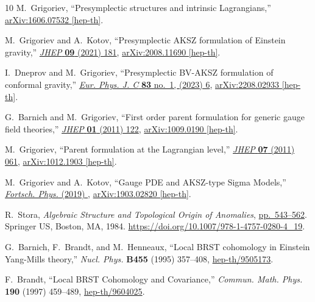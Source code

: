 \documentclass[a4paper,12pt]{article}
\numberwithin{equation}{section} %
\begin{document}
\begin{thebibliography}{10}
M.~Grigoriev, ``{Presymplectic structures and intrinsic Lagrangians},''
\href{http://arxiv.org/abs/1606.07532}{{\ttfamily arXiv:1606.07532 [hep-th]}}.

M.~Grigoriev and A.~Kotov, ``{Presymplectic AKSZ formulation of Einstein gravity},'' \href{http://dx.doi.org/10.1007/JHEP09(2021)181}{{\em JHEP} {\bfseries 09} (2021) 181}, \href{http://arxiv.org/abs/2008.11690}{{\ttfamily arXiv:2008.11690 [hep-th]}}.

I.~Dneprov and M.~Grigoriev, ``{Presymplectic BV-AKSZ formulation of conformal gravity},'' \href{http://dx.doi.org/10.1140/epjc/s10052-022-11082-6}{{\em Eur. Phys. J. C} {\bfseries 83} no.~1, (2023) 6}, \href{http://arxiv.org/abs/2208.02933}{{\ttfamily arXiv:2208.02933 [hep-th]}}.

G.~Barnich and M.~Grigoriev, ``{F}irst order parent formulation for generic gauge field theories,'' \href{http://dx.doi.org/10.1007/JHEP01(2011)122}{{\em JHEP} {\bfseries 01} (2011) 122},
\href{http://arxiv.org/abs/1009.0190}{{\ttfamily arXiv:1009.0190 [hep-th]}}.

M.~Grigoriev, ``{P}arent formulation at the {L}agrangian level,'' \href{http://dx.doi.org/10.1007/JHEP07(2011)061}{{\em JHEP} {\bfseries 07} (2011) 061},
\href{http://arxiv.org/abs/1012.1903}{{\ttfamily arXiv:1012.1903 [hep-th]}}.

M.~Grigoriev and A.~Kotov, ``{Gauge PDE and AKSZ-type Sigma Models},'' \href{http://dx.doi.org/10.1002/1521-3978(200209)50:8/9<825::AID-PROP825>3.0.CO;2-V}{{\em Fortsch. Phys.} (2019) }, \href{http://arxiv.org/abs/1903.02820}{{\ttfamily arXiv:1903.02820 [hep-th]}}.

R.~Stora, {\em Algebraic Structure and Topological Origin of Anomalies}, \href{http://dx.doi.org/10.1007/978-1-4757-0280-4_19}{pp.~543--562}.
\newblock Springer US, Boston, MA, 1984.
\newblock \url{https://doi.org/10.1007/978-1-4757-0280-4_19}.

G.~Barnich, F.~Brandt, and M.~Henneaux, ``{L}ocal {BRST} cohomology in {E}instein {Y}ang-{M}ills theory,'' {\em Nucl. Phys.} {\bfseries B455} (1995) 357--408,
\href{http://arxiv.org/abs/hep-th/9505173}{{\ttfamily hep-th/9505173}}.

F.~Brandt, ``{L}ocal {BRST} {C}ohomology and {C}ovariance,'' {\em Commun. Math. Phys.} {\bfseries 190} (1997) 459--489,
\href{http://arxiv.org/abs/hep-th/9604025}{{\ttfamily hep-th/9604025}}.


\end{thebibliography}
\end{document}

